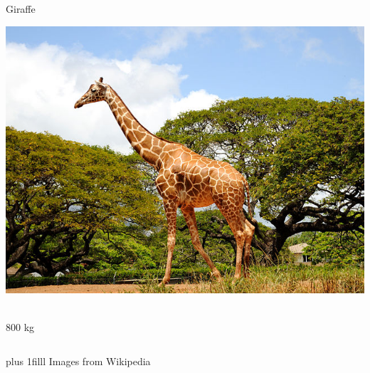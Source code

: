 \documentclass{beamer}
\newcommand{\btVFill}{\vskip0pt plus 1filll}
\begin{document}
\begin{frame}
\begin{columns}[c]
     \begin{block}{Giraffe}
      \begin{center}
        \includegraphics[height=.25\textheight]{640px-Giraffe!_(4565230826).jpg}\
      \end{center}
      800 kg
    \end{block}
  \end{columns}

  \btVFill
  \small Images from Wikipedia \normalsize
\end{frame}
\end{document}
